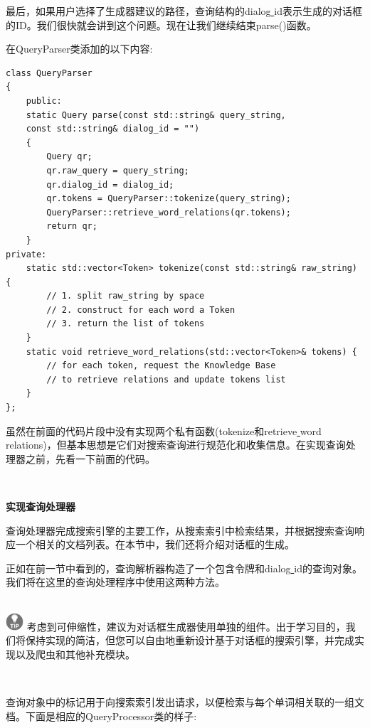 最后，如果用户选择了生成器建议的路径，查询结构的dialog\underline{ }id表示生成的对话框的ID。我们很快就会讲到这个问题。现在让我们继续结束parse()函数。 \par
在QueryParser类添加的以下内容: \par

\begin{lstlisting}[caption={}]
class QueryParser
{
	public:
	static Query parse(const std::string& query_string,
	const std::string& dialog_id = "")
	{
		Query qr;
		qr.raw_query = query_string;
		qr.dialog_id = dialog_id;
		qr.tokens = QueryParser::tokenize(query_string);
		QueryParser::retrieve_word_relations(qr.tokens);
		return qr;
	}
private:
	static std::vector<Token> tokenize(const std::string& raw_string) {
		// 1. split raw_string by space
		// 2. construct for each word a Token
		// 3. return the list of tokens
	}
	static void retrieve_word_relations(std::vector<Token>& tokens) {
		// for each token, request the Knowledge Base
		// to retrieve relations and update tokens list
	}
};
\end{lstlisting}

虽然在前面的代码片段中没有实现两个私有函数(tokenize和retrieve\underline{ }word\underline{ }relations)，但基本思想是它们对搜索查询进行规范化和收集信息。在实现查询处理器之前，先看一下前面的代码。 \par

\noindent\textbf{}\ \par
\textbf{实现查询处理器} \ \par
查询处理器完成搜索引擎的主要工作，从搜索索引中检索结果，并根据搜索查询响应一个相关的文档列表。在本节中，我们还将介绍对话框的生成。 \par
正如在前一节中看到的，查询解析器构造了一个包含令牌和dialog\underline{ }id的查询对象。我们将在这里的查询处理程序中使用这两种方法。 \par

\hspace*{\fill} \\ %
\includegraphics[width=0.05\textwidth]{images/tip}
考虑到可伸缩性，建议为对话框生成器使用单独的组件。出于学习目的，我们将保持实现的简洁，但您可以自由地重新设计基于对话框的搜索引擎，并完成实现以及爬虫和其他补充模块。 \par
\noindent\textbf{}\ \par

查询对象中的标记用于向搜索索引发出请求，以便检索与每个单词相关联的一组文档。下面是相应的QueryProcessor类的样子: \par

